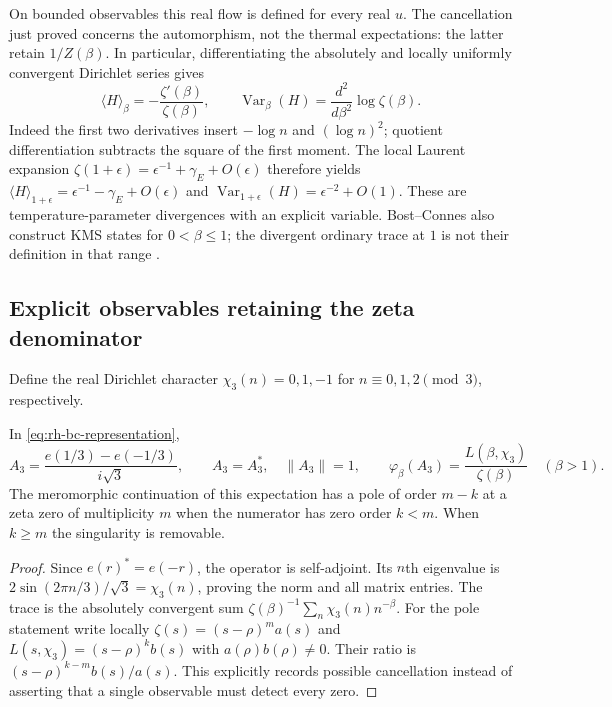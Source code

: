 On bounded observables this real flow is defined for every real $u$.
The cancellation just proved concerns the automorphism, not the thermal
expectations: the latter retain $1/Z(\beta)$. In particular, differentiating
the absolutely and locally uniformly convergent Dirichlet series gives
\begin{equation}
 \langle H\rangle_\beta=-\frac{\zeta'(\beta)}{\zeta(\beta)},\qquad
 \operatorname{Var}_\beta(H)=\frac{d^2}{d\beta^2}\log\zeta(\beta).
 \label{eq:rh-energy-cumulants}
\end{equation}
Indeed the first two derivatives insert $-\log n$ and $(\log n)^2$;
quotient differentiation subtracts the square of the first moment.
The local Laurent expansion $\zeta(1+\epsilon)=\epsilon^{-1}+\gamma_E+O(\epsilon)$
therefore yields
$\langle H\rangle_{1+\epsilon}=\epsilon^{-1}-\gamma_E+O(\epsilon)$ and
$\operatorname{Var}_{1+\epsilon}(H)=\epsilon^{-2}+O(1)$.
These are temperature-parameter divergences with an explicit variable.
Bost--Connes also construct KMS states for $0<\beta\le1$; the divergent
ordinary trace at $1$ is not their definition in that range
\cite[\S7]{bostConnes1995}.

\subsection{Explicit observables retaining the zeta denominator}

Define the real Dirichlet character
$\chi_3(n)=0,1,-1$ for $n\equiv0,1,2\pmod3$, respectively.
\begin{proposition}
In \eqref{eq:rh-bc-representation},
\begin{equation}
 A_3=\frac{e(1/3)-e(-1/3)}{i\sqrt3},\qquad
 A_3=A_3^*,\quad \|A_3\|=1,\qquad
 \varphi_\beta(A_3)=\frac{L(\beta,\chi_3)}{\zeta(\beta)}\quad(\beta>1).
 \label{eq:rh-a3-observable}
\end{equation}
The meromorphic continuation of this expectation has a pole of order $m-k$
at a zeta zero of multiplicity $m$ when the numerator has zero order $k<m$.
When $k\ge m$ the singularity is removable.
\end{proposition}
\begin{proof}
Since $e(r)^*=e(-r)$, the operator is self-adjoint. Its $n$th eigenvalue is
$2\sin(2\pi n/3)/\sqrt3=\chi_3(n)$, proving the norm and all matrix entries.
The trace is the absolutely convergent sum
$\zeta(\beta)^{-1}\sum_n\chi_3(n)n^{-\beta}$.
For the pole statement write locally
$\zeta(s)=(s-\rho)^m a(s)$ and
$L(s,\chi_3)=(s-\rho)^k b(s)$ with $a(\rho)b(\rho)\ne0$.
Their ratio is $(s-\rho)^{k-m}b(s)/a(s)$.
This explicitly records possible cancellation instead of asserting that a
single observable must detect every zero.
\end{proof}

